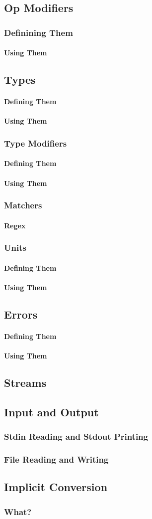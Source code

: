 \documentclass{article}
\newcommand{\ssecl}[1]{\subsection{#1}\label{ssec:#1}}
\newcommand{\sssecl}[1]{\subsubsection{#1}\label{sssec:#1}}
\begin{document}
\ssecl{Op Modifiers}
\sssecl{Definining Them}
\paragraph{Using Them}
\ssecl{Types}
\paragraph{Defining Them}

\paragraph{Using Them}

\sssecl{Type Modifiers}
\paragraph{Defining Them}

\paragraph{Using Them}

\sssecl{Matchers}
\paragraph{Regex} \label{par:Regex}

\sssecl{Units}
\paragraph{Defining Them}

\paragraph{Using Them}

\ssecl{Errors}
\paragraph{Defining Them}

\paragraph{Using Them}

\ssecl{Streams}
\ssecl{Input and Output}
\sssecl{Stdin Reading and Stdout Printing}

\sssecl{File Reading and Writing}

\ssecl{Implicit Conversion}
\sssecl{What?}
\end{document}
